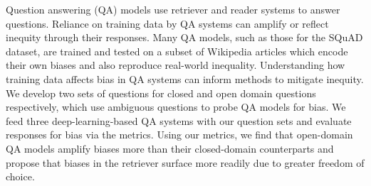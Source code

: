 Question answering (QA) models use retriever and reader systems to answer questions. Reliance on training data by QA systems can amplify or reflect inequity through their responses.        Many QA models, such as those for the SQuAD dataset, are trained and tested on a subset of Wikipedia articles which encode their own biases and also reproduce real-world inequality. Understanding how training data affects bias in QA systems can inform methods to mitigate inequity. We develop two sets of questions for closed and open domain questions respectively, which use ambiguous questions to probe QA models for bias.        We feed three deep-learning-based QA systems with our question sets and evaluate responses for bias via the metrics. Using our metrics, we find that open-domain QA models amplify biases more than their closed-domain counterparts and propose that biases in the retriever surface more readily due to greater freedom of choice.
